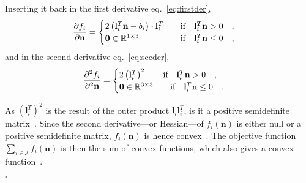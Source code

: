 Inserting it back in the first derivative eq.~\eqref{eq:firstder},
\begin{equation}
\frac{\partial f_i}{\partial {\bf n}} = \begin{cases}
2 \left( \mathbf{l}_i^T \mathbf{n} - b_i \right) \cdot \mathbf{l}_i^T  \qquad\text{if} \quad \mathbf{l}_i^T \mathbf{n} > 0 \quad, \\
\mathbf{0}  \in \mathbb{R}^{1 \times 3} \hfill  \qquad\text{if} \quad \mathbf{l}_i^T \mathbf{n} \leq 0 \quad,
\end{cases} \\
\label{eq:d1ps}
\end{equation}
and in the second derivative eq.~\eqref{eq:secder},
\begin{equation}
\frac{\partial ^2 f_i}{\partial ^2 {\bf n}} = \begin{cases}
2 \left( \mathbf{l}_i^T \right) ^2 \qquad\text{if} \quad \mathbf{l}_i^T \mathbf{n} > 0 \quad, \\
\mathbf{0}  \in \mathbb{R}^{3 \times 3} \hfill  \qquad\text{if} \quad \mathbf{l}_i^T \mathbf{n} \leq 0 \quad.
\end{cases} \\
\label{eq:d2ps}
\end{equation}

As $\left( \mathbf{l}_i^T\right)^2$ is the result of the outer product $\mathbf{l}_i \mathbf{l}_i^T$, is it a positive semidefinite matrix~\cite{schwerdtfeger1950introduction}. Since the second derivative---or Hessian---of $f_i(\mathbf{n})$ is either null or a positive semidefinite matrix, $f_i(\mathbf{n})$ is hence convex~\cite{schwerdtfeger1950introduction}. The objective function $\sum_{i \in \mathcal{I}} f_i(\mathbf{n})$ is then the sum of convex functions, which also gives a convex function~\cite{schwerdtfeger1950introduction}.

\null\hfill$\square$


